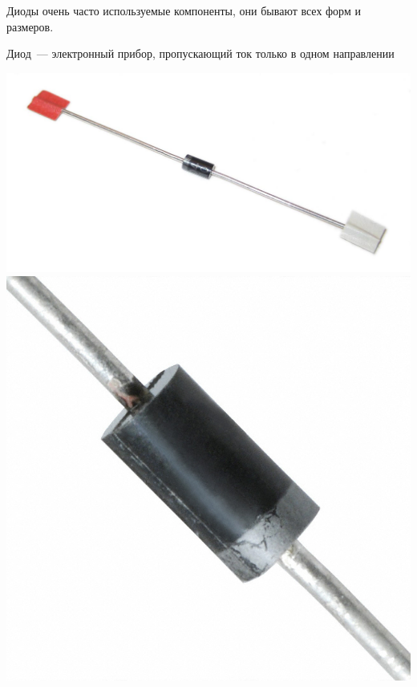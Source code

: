
Диоды очень часто используемые компоненты, они бывают всех форм и размеров.

\begin{framed}\noindent
Диод\ --- электронный прибор, пропускающий ток только в одном направлении
\end{framed}

\includegraphics[height=0.3\textheight]{bcollis/vd/1N4004.jpg}
\includegraphics[height=0.3\textheight]{bcollis/vd/1N4007.jpg}
